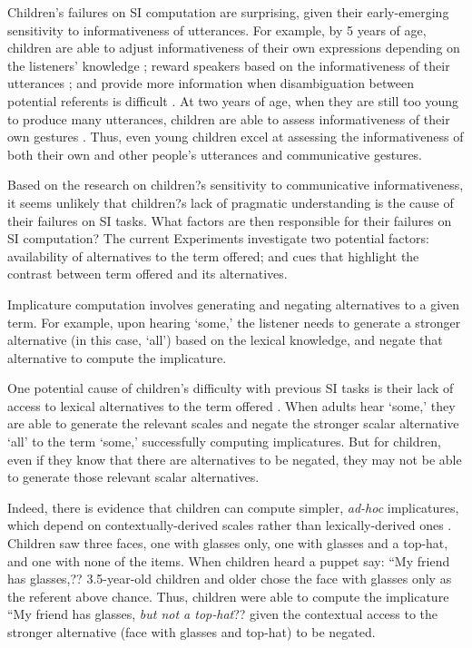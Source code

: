 \documentclass[10pt,letterpaper]{article}
\begin{document}
Children's failures on SI computation are surprising, given their early-emerging sensitivity to informativeness of utterances. For example, by 5 years of age, children are able to adjust informativeness of their own expressions depending on the listeners' knowledge \cite{matthews2006effect}; reward speakers based on the informativeness of their utterances \cite{katsos2011pragmatic}; and provide more information when disambiguation between potential referents is difficult \cite{matthews2012two}. At two years of age, when they are still too young to produce many utterances, children are able to assess informativeness of their own gestures \cite{o2001two}. Thus, even young children excel at assessing the informativeness of both their own and other people's utterances and communicative gestures. 

Based on the research on children?s sensitivity to communicative informativeness, it seems unlikely that children?s lack of pragmatic understanding is the cause of their failures on SI tasks. What factors are then responsible for their failures on SI computation? The current Experiments investigate two potential factors: availability of alternatives to the term offered; and cues that highlight the contrast between term offered and its alternatives. 

Implicature computation involves generating and negating alternatives to a given term. For example, upon hearing `some,' the listener needs to generate a stronger alternative (in this case, `all') based on the lexical knowledge, and negate that alternative to compute the implicature.  

One potential cause of children's difficulty with previous SI tasks is their lack of access to lexical alternatives to the term offered \cite{barner2011accessing}. When adults hear `some,' they are able to generate the relevant scales and negate the stronger scalar alternative `all' to the term `some,' successfully computing implicatures. But for children, even if they know that there are alternatives to be negated, they may not be able to generate those relevant scalar alternatives. 

Indeed, there is evidence that children can compute simpler, \emph{ad-hoc} implicatures, which depend on contextually-derived scales rather than lexically-derived ones \cite{stillerLLD}. Children saw three faces, one with glasses only, one with glasses and a top-hat, and one with none of the items. When children heard a puppet say: ``My friend has glasses,?? 3.5-year-old children and older chose the face with glasses only as the referent above chance. Thus, children were able to compute the implicature ``My friend has glasses, \emph{but not a top-hat}?? given the contextual access to the stronger alternative (face with glasses and top-hat) to be negated. 
\end{document}
